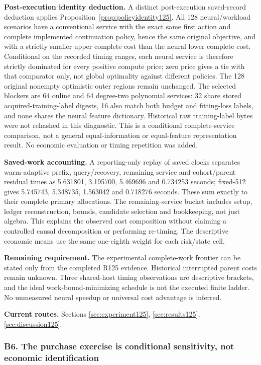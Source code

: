 \noindent\textbf{Post-execution identity deduction.} A distinct post-execution saved-record deduction applies Proposition~\ref{prop:policyidentity125}. All 128 neural/workload scenarios have a conventional service with the exact same first action and complete implemented continuation policy, hence the same original objective, and with a strictly smaller upper complete cost than the neural lower complete cost. Conditional on the recorded timing ranges, each neural service is therefore strictly dominated for every positive compute price; zero price gives a tie with that comparator only, not global optimality against different policies. The 128 original nonempty optimistic outer regions remain unchanged. The selected blockers are 64 online and 64 degree-two polynomial services: 32 share stored acquired-training-label digests, 16 also match both budget and fitting-loss labels, and none shares the neural feature dictionary. Historical raw training-label bytes were not rehashed in this diagnostic. This is a conditional complete-service comparison, not a general equal-information or equal-feature representation result. No economic evaluation or timing repetition was added.

\noindent\textbf{Saved-work accounting.} A reporting-only replay of saved clocks separates warm-adaptive prefix, query/recovery, remaining service and cohort/parent residual times as 5.631801, 3.195700, 5.469696 and 0.734253 seconds; fixed-512 gives 5.745743, 5.348735, 1.563042 and 0.718276 seconds. These sum exactly to their complete primary allocations. The remaining-service bucket includes setup, ledger reconstruction, bounds, candidate selection and bookkeeping, not just algebra. This explains the observed cost composition without claiming a controlled causal decomposition or performing re-timing. The descriptive economic means use the same one-eighth weight for each risk/state cell.

\noindent\textbf{Remaining requirement.} The experimental complete-work frontier can be stated only from the completed R125 evidence. Historical interrupted parent costs remain unknown. Three shared-host timing observations are descriptive brackets, and the ideal work-bound-minimizing schedule is not the executed finite ladder. No unmeasured neural speedup or universal cost advantage is inferred.

\noindent\textbf{Current routes.} Sections \ref{sec:experiment125}, \ref{sec:results125}, \ref{sec:discussion125}.

\subsubsection{B6. The purchase exercise is conditional sensitivity, not economic identification}

